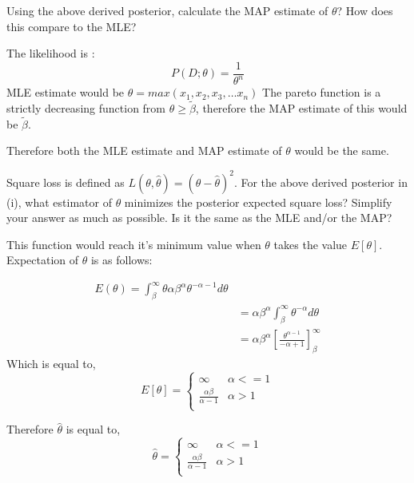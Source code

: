 \documentclass[solution,addpoints,12pt]{exam}
\begin{document}
\begin{questions}
\begin{parts}
\begin{subparts}
\begin{solution}
\end{solution}

\subpart[1\half] Using the above derived posterior, calculate the MAP estimate of $\theta$? How does this compare to the MLE?
\begin{solution}

The likelihood is :  
\[
  P(D;\theta) = \frac{1}{\theta^{n}}
\]
MLE estimate would be $\theta = max(x_1, x_2, x_3, \ldots x_n)$
The pareto function is a strictly decreasing function from $\theta \geq \widetilde{\beta}$, 
therefore the MAP estimate of this would be $\widetilde{\beta}$. 

Therefore both the MLE estimate and MAP estimate of $\theta$ would be the same.  

\end{solution}

\subpart[2] Square loss is defined as $L(\theta, \hat{\theta}) = (\theta - \hat{\theta})^2$. For the above derived posterior in (i), 
what estimator of $\theta$ minimizes the posterior expected square loss? Simplify your answer as much as possible. Is it the same as the MLE and/or the MAP?
\begin{solution}
This function would reach it's minimum value when $\theta$ takes the value $E[\theta]$. 
Expectation of $\theta$ is as follows:

\begin{align*}
  E(\theta) = \int_{\beta}^{\infty} \theta \alpha \beta ^{\alpha}\theta^{-\alpha-1} d\theta \\ 
  &= \alpha\beta^{\alpha} \int_{\beta}^{\infty} \theta^{-\alpha} d\theta \\ 
  &= \alpha \beta^{\alpha} \left[ \frac{\theta^{\alpha-1}}{-\alpha +1} \right]^{\infty}_{\beta}
\end{align*}
Which is equal to, \\ 

\[  
  E[\theta] = \begin{cases}
      \infty &  \alpha <= 1  \\ 
      \frac{\alpha \beta}{\alpha-1} & \alpha > 1 \\
  \end{cases}
\]

Therefore $\hat{\theta}$ is equal to, 
\[  
  \hat{\theta} = \begin{cases}
      \infty &  \alpha <= 1  \\ 
      \frac{\alpha \beta}{\alpha-1} & \alpha > 1 \\
  \end{cases}
\]



\end{solution}
\end{subparts}
\end{parts}
\end{questions}
\end{document}
